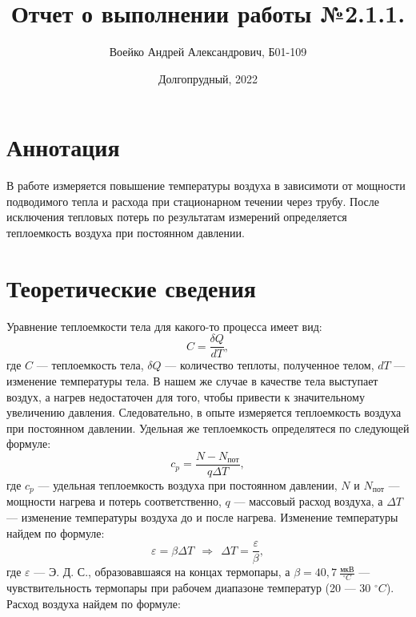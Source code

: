 \documentclass[a4paper,11pt]{article}
\title{Отчет о выполнении работы №2.1.1.}
\author{Воейко Андрей Александрович, Б01-109}
\date{Долгопрудный, 2022}
\begin{document}
\maketitle
\newpage
\section{Аннотация}
В работе измеряется повышение температуры воздуха в зависимоти от мощности подводимого тепла и расхода при стационарном течении через трубу. После исключения тепловых потерь по результатам измерений определяется теплоемкость воздуха при постоянном давлении.
\section{Теоретические сведения}
Уравнение теплоемкости тела для какого-то процесса имеет вид:\newline
\begin{equation}    \label{eq1}
C = \frac{\delta Q}{dT},
\end{equation}
где $C$ — теплоемкость тела, $\delta Q$ — количество теплоты, полученное телом, $dT$ — изменение температуры тела.
В нашем же случае в качестве тела выступает воздух, а нагрев недостаточен для того, чтобы привести к значительному увеличению давления. Следовательно, в опыте измеряется теплоемкость воздуха при постоянном давлении.\newline
Удельная же теплоемкость определятеся по следующей формуле:\newline
\begin{equation}    \label{eq2}
c_{p} = \frac{N - N_{пот}}{q \Delta T},
\end{equation}
где $c_{p}$ — удельная теплоемкость воздуха при постоянном давлении, $N$ и $N_{пот}$ — мощности нагрева и потерь соответственно, $q$ — массовый расход воздуха, а $\Delta T$ — изменение температуры воздуха до и после нагрева.\newline
Изменение температуры найдем по формуле:\newline
\begin{equation}    \label{eq3}
\varepsilon = \beta \Delta T\ \ \Rightarrow\ \ \Delta T = \frac{\varepsilon}{\beta},
\end{equation}
где $\varepsilon$ — Э. Д. С., образовавшаяся на концах термопары, а $\beta = 40,7\ \frac{мкВ}{^{\circ}C}$ — чувствительность термопары при рабочем диапазоне температур (20 — 30 $^{\circ}C$).\newline
Расход воздуха найдем по формуле:\newline
\end{document}
